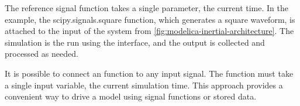 \documentclass[\rootfolder/main.tex]{subfiles}
\begin{document}
The reference signal function takes a single parameter, the current time.
In the example, the scipy.signals.square function, which generates a square waveform, is attached to the input of the system from \cref{fig:modelica-inertial-architecture}.
The simulation is the run using the interface, and the output is collected and processed as needed.

It is possible to connect an function to any input signal.
The function must take a single input variable, the current simulation time.
This approach provides a convenient way to drive a model using signal functions or stored data.
\end{document}

